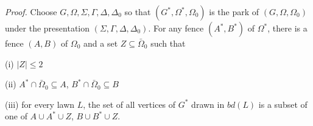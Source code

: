 \textit{Proof.} Choose $G, \Omega, \Sigma, \Gamma, \Delta, \Delta_0$ so that $(G^*, \Omega^*, \Omega_0)$ is the park of $(G, \Omega, \Omega_0)$ under the presentation $(\Sigma, \Gamma, \Delta, \Delta_0)$. For any fence $(A^*, B^*)$ of $\Omega^*$, there is a fence $(A, B)$ of $\Omega_0$ and a set $Z \subseteq \bar{\Omega}_0$ such that

\hspace*{12pt}(i) $|Z| \le 2$

\hspace*{12pt}(ii) $A^* \cap \bar{\Omega}_0 \subseteq A$, $B^* \cap \bar{\Omega}_0 \subseteq B$

\hspace*{12pt}(iii) for every lawn $L$, the set of all vertices of $G^*$ drawn in $bd(L)$ is a subset of one of $A \cup A^* \cup Z$, $B \cup B^* \cup Z$.
